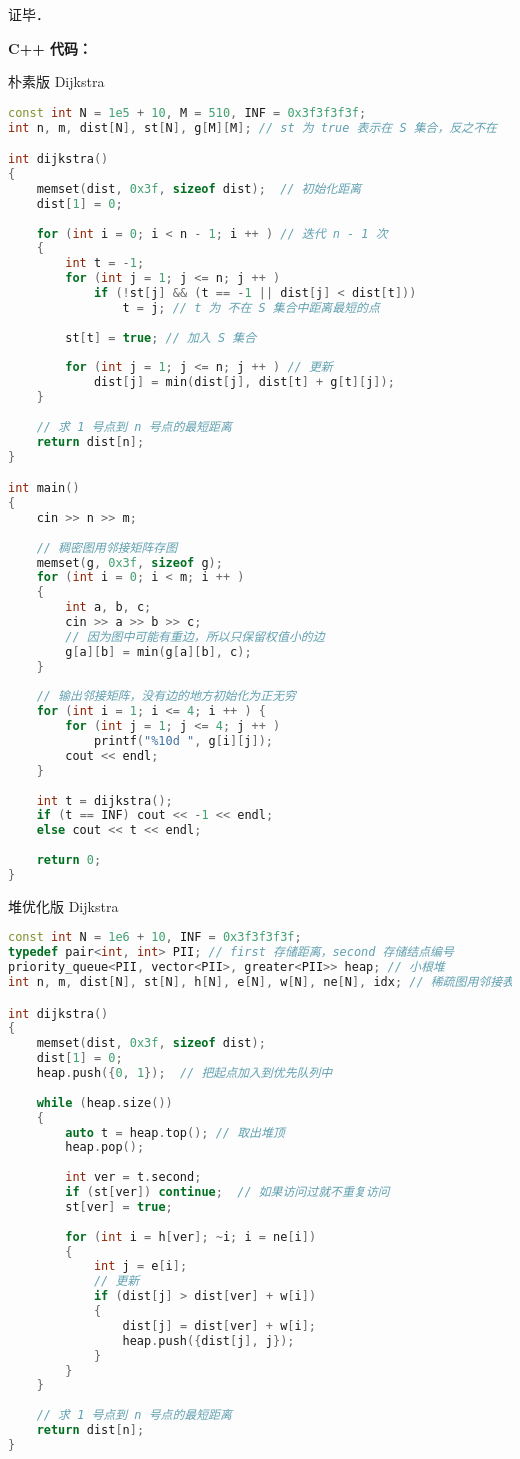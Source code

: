 证毕．

\textbf{C++ 代码：}

朴素版 Dijkstra
\begin{lstlisting}[language=cpp]
const int N = 1e5 + 10, M = 510, INF = 0x3f3f3f3f;
int n, m, dist[N], st[N], g[M][M]; // st 为 true 表示在 S 集合，反之不在

int dijkstra()
{
    memset(dist, 0x3f, sizeof dist);  // 初始化距离
    dist[1] = 0;
    
    for (int i = 0; i < n - 1; i ++ ) // 迭代 n - 1 次
    {
        int t = -1;
        for (int j = 1; j <= n; j ++ )
            if (!st[j] && (t == -1 || dist[j] < dist[t]))
                t = j; // t 为 不在 S 集合中距离最短的点
        
        st[t] = true; // 加入 S 集合
        
        for (int j = 1; j <= n; j ++ ) // 更新
            dist[j] = min(dist[j], dist[t] + g[t][j]);
    }
    
    // 求 1 号点到 n 号点的最短距离
    return dist[n];
}

int main()
{
    cin >> n >> m;
    
    // 稠密图用邻接矩阵存图
    memset(g, 0x3f, sizeof g);
    for (int i = 0; i < m; i ++ ) 
    {
        int a, b, c;
        cin >> a >> b >> c;
        // 因为图中可能有重边，所以只保留权值小的边
        g[a][b] = min(g[a][b], c);
    }
    
    // 输出邻接矩阵，没有边的地方初始化为正无穷
    for (int i = 1; i <= 4; i ++ ) {
        for (int j = 1; j <= 4; j ++ )
            printf("%10d ", g[i][j]);
        cout << endl;
    }
    
    int t = dijkstra();
    if (t == INF) cout << -1 << endl; 
    else cout << t << endl;
    
    return 0;
}
\end{lstlisting}

堆优化版 Dijkstra

\begin{lstlisting}[language=cpp]
const int N = 1e6 + 10, INF = 0x3f3f3f3f;
typedef pair<int, int> PII; // first 存储距离，second 存储结点编号
priority_queue<PII, vector<PII>, greater<PII>> heap; // 小根堆
int n, m, dist[N], st[N], h[N], e[N], w[N], ne[N], idx; // 稀疏图用邻接表存图

int dijkstra()
{
    memset(dist, 0x3f, sizeof dist);
    dist[1] = 0;
    heap.push({0, 1});  // 把起点加入到优先队列中
    
    while (heap.size())
    {
        auto t = heap.top(); // 取出堆顶
        heap.pop();
        
        int ver = t.second;
        if (st[ver]) continue;  // 如果访问过就不重复访问
        st[ver] = true;
        
        for (int i = h[ver]; ~i; i = ne[i])
        {
            int j = e[i];
            // 更新
            if (dist[j] > dist[ver] + w[i])
            {
                dist[j] = dist[ver] + w[i];
                heap.push({dist[j], j});
            }
        }
    }
    
    // 求 1 号点到 n 号点的最短距离
    return dist[n];
}
\end{lstlisting}

